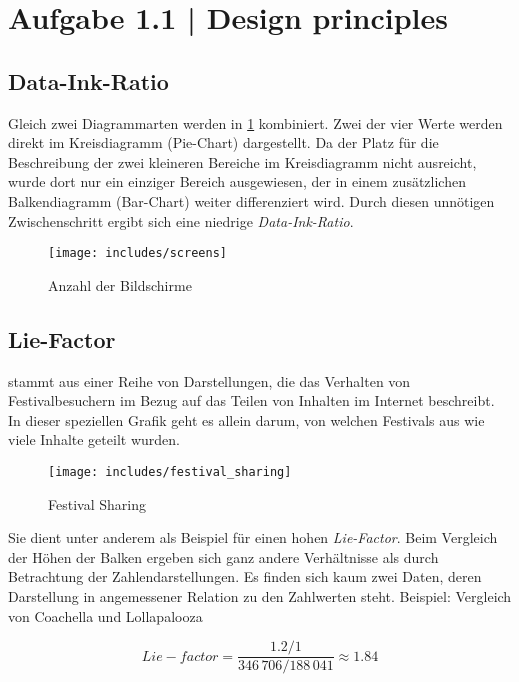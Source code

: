 \documentclass[a4paper,12pt,ngerman]{scrartcl}
\begin{document}
\pagestyle{fancy} %

\section{Aufgabe 1.1 | Design principles}

\subsection*{Data-Ink-Ratio}

Gleich zwei Diagrammarten werden in \cref{screens} kombiniert. Zwei der vier Werte werden direkt im Kreisdiagramm (Pie-Chart) dargestellt. Da der Platz für die Beschreibung der zwei kleineren Bereiche im Kreisdiagramm nicht ausreicht, wurde dort nur ein einziger Bereich ausgewiesen, der in einem zusätzlichen Balkendiagramm (Bar-Chart) weiter differenziert wird. Durch diesen unnötigen Zwischenschritt ergibt sich eine niedrige \emph{Data-Ink-Ratio}.

\begin{figure}[ht]
    \centering
    \texttt{[image: includes/screens]}
    \caption{Anzahl der Bildschirme}
    \label{screens}
\end{figure}

\subsection*{Lie-Factor}
 stammt aus einer Reihe von Darstellungen, die das Verhalten von Festivalbesuchern im Bezug auf das Teilen von Inhalten im Internet beschreibt. In dieser speziellen Grafik geht es allein darum, von welchen Festivals aus wie viele Inhalte geteilt wurden.

\begin{figure}[ht]
    \centering
    \texttt{[image: includes/festival\_sharing]}
    \caption{Festival Sharing}
    \label{festival_sharing}
\end{figure}

Sie dient unter anderem als Beispiel für einen hohen \emph{Lie-Factor}. Beim Vergleich der Höhen der Balken ergeben sich ganz andere Verhältnisse als durch Betrachtung der  Zahlendarstellungen. Es finden sich kaum zwei Daten, deren Darstellung in angemessener Relation zu den Zahlwerten steht.
Beispiel: Vergleich von Coachella und Lollapalooza

\begin{equation}
    Lie-factor = \frac{1.2 / 1}{346\,706 / 188\,041} \approx 1.84
\end{equation}
\end{document}
